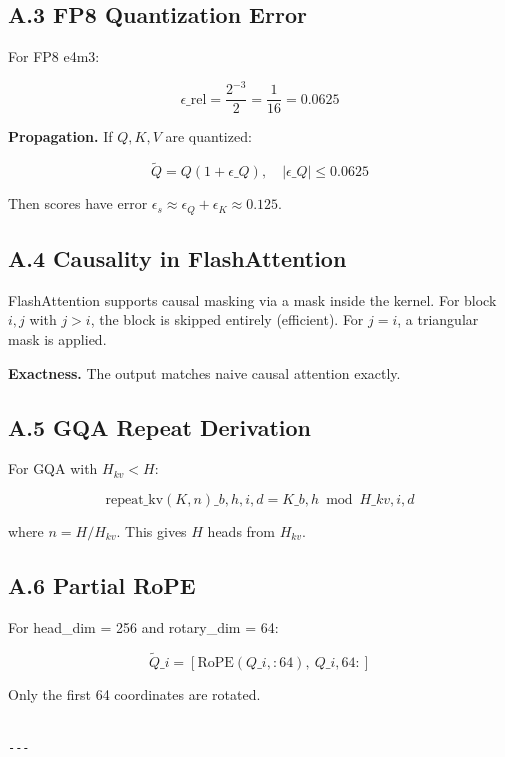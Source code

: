 \subsection{A.3 FP8 Quantization Error}

For FP8 e4m3:

\[
\epsilon\_{\text{rel}} = \frac{2^{-3}}{2} = \frac{1}{16} = 0.0625
\tag{A.6}
\]

\textbf{Propagation.} If $Q, K, V$ are quantized:

\[
\tilde{Q} = Q(1 + \epsilon\_Q), \quad |\epsilon\_Q| \leq 0.0625
\tag{A.7}
\]

Then scores have error $\epsilon_s \approx \epsilon_Q + \epsilon_K \approx 0.125$.

\subsection{A.4 Causality in FlashAttention}

FlashAttention supports causal masking via a mask inside the kernel. For 
block $i, j$ with $j > i$, the block is skipped entirely (efficient). For 
$j = i$, a triangular mask is applied.

\textbf{Exactness.} The output matches naive causal attention exactly.

\subsection{A.5 GQA Repeat Derivation}

For GQA with $H_{kv} < H$:

\[
\text{repeat\_kv}(K, n)\_{b, h, i, d} = K\_{b, h \bmod H\_{kv}, i, d}
\tag{A.8}
\]

where $n = H / H_{kv}$. This gives $H$ heads from $H_{kv}$.

\subsection{A.6 Partial RoPE}

For head\_dim = 256 and rotary\_dim = 64:

\[
\tilde{Q}\_i = [\text{RoPE}(Q\_{i, :64}), \ Q\_{i, 64:}]
\tag{A.9}
\]

Only the first 64 coordinates are rotated.
\begin{lstlisting}

---
\end{lstlisting}